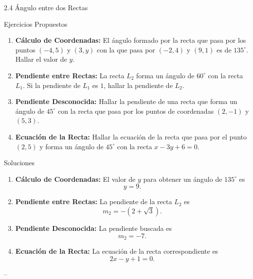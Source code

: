 \documentclass[10pt,aspectratio=169,spanish]{beamer}
\begin{document}
\begin{frame}{2.4 Ángulo entre dos Rectas}
\begin{block}{Ejercicios Propuestos}
\begin{enumerate}
    \item \textbf{Cálculo de Coordenadas:} El ángulo formado por la recta que pasa por los puntos $(-4, 5)$ y $(3, y)$ con la que pasa por $(-2, 4)$ y $(9, 1)$ es de $135^\circ$. Hallar el valor de $y$.

    \item \textbf{Pendiente entre Rectas:} La recta $L_2$ forma un ángulo de $60^\circ$ con la recta $L_1$. Si la pendiente de $L_1$ es $1$, hallar la pendiente de $L_2$.

    \item \textbf{Pendiente Desconocida:} Hallar la pendiente de una recta que forma un ángulo de $45^\circ$ con la recta que pasa por los puntos de coordenadas $(2, -1)$ y $(5, 3)$.

    \item \textbf{Ecuación de la Recta:} Hallar la ecuación de la recta que pasa por el punto $(2, 5)$ y forma un ángulo de $45^\circ$ con la recta $x - 3y + 6 = 0$.
\end{enumerate}
\end{block}
\end{frame}


\begin{frame}{ Soluciones}
\begin{enumerate}
    \item \textbf{Cálculo de Coordenadas:}
    El valor de $y$ para obtener un ángulo de $135^\circ$ es
    \[
    \boxed{y = 9}.
    \]

    \item \textbf{Pendiente entre Rectas:}
    La pendiente de la recta $L_2$ es
    \[
    \boxed{m_2 = -(2 + \sqrt{3})}.
    \]

    \item \textbf{Pendiente Desconocida:}
    La pendiente buscada es
    \[
    \boxed{m_2 = -7}.
    \]

    \item \textbf{Ecuación de la Recta:}
    La ecuación de la recta correspondiente es
    \[
    \boxed{2x - y + 1 = 0}.
    \]
\end{enumerate}
\end{frame}--

\end{document}
